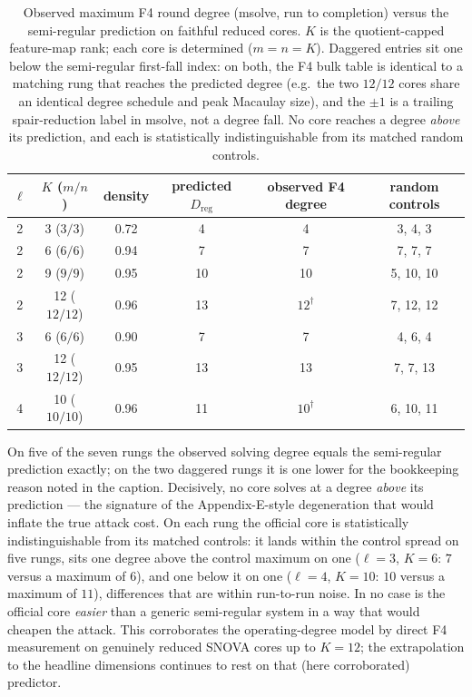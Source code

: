 \documentclass[11pt]{article}
\begin{document}
\begin{table}[t]
\centering
\caption{Observed maximum F4 round degree (msolve, run to completion) versus the
semi-regular prediction on faithful reduced cores.  $K$ is the quotient-capped
feature-map rank; each core is determined ($m=n=K$).  Daggered entries sit one
below the semi-regular first-fall index: on both, the F4 bulk table is identical
to a matching rung that reaches the predicted degree (e.g.\ the two $12/12$
cores share an identical degree schedule and peak Macaulay size), and the $\pm1$
is a trailing spair-reduction label in msolve, not a degree fall.  No core
reaches a degree \emph{above} its prediction, and each is statistically
indistinguishable from its matched random controls.}
\label{tab:ladder}
\begin{tabular}{cccccc}
\toprule
$\ell$ & $K$ ($m/n$) & density & predicted $D_\mathrm{reg}$ & observed F4 degree & random controls \\
\midrule
2 & 3 ($3/3$)    & 0.72 & 4  & 4              & 3, 4, 3   \\
2 & 6 ($6/6$)    & 0.94 & 7  & 7              & 7, 7, 7   \\
2 & 9 ($9/9$)    & 0.95 & 10 & 10             & 5, 10, 10 \\
2 & 12 ($12/12$) & 0.96 & 13 & $12^{\dagger}$ & 7, 12, 12 \\
3 & 6 ($6/6$)    & 0.90 & 7  & 7              & 4, 6, 4   \\
3 & 12 ($12/12$) & 0.95 & 13 & 13             & 7, 7, 13  \\
4 & 10 ($10/10$) & 0.96 & 11 & $10^{\dagger}$ & 6, 10, 11 \\
\bottomrule
\end{tabular}
\end{table}

On five of the seven rungs the observed solving degree equals the semi-regular
prediction exactly; on the two daggered rungs it is one lower for the bookkeeping
reason noted in the caption.  Decisively, no core solves at a degree
\emph{above} its prediction --- the signature of the Appendix-E-style
degeneration that would inflate the true attack cost.  On each rung the official
core is statistically indistinguishable from its matched controls: it lands
within the control spread on five rungs, sits one degree above the control
maximum on one ($\ell=3$, $K=6$: $7$ versus a maximum of $6$), and one below it
on one ($\ell=4$, $K=10$: $10$ versus a maximum of $11$), differences that are
within run-to-run noise.  In no case is the official core \emph{easier} than a
generic semi-regular system in a way that would cheapen the attack.  This corroborates the operating-degree model by
direct F4 measurement on genuinely reduced SNOVA cores up to $K=12$; the
extrapolation to the headline dimensions continues to rest on that (here
corroborated) predictor.
\end{document}
